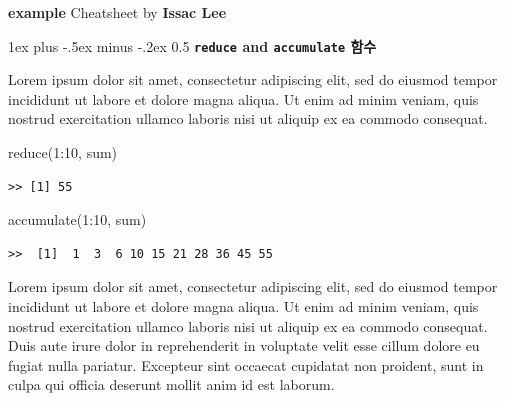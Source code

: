 \documentclass[10pt,quotespacing]{oblivoir}
\makeatletter
\newenvironment{Shaded}{\begin{snugshade}}{\end{snugshade}}
\newcommand{\DecValTok}[1]{\textcolor[rgb]{0.00,0.00,0.81}{#1}}
\newcommand{\FunctionTok}[1]{\textcolor[rgb]{0.00,0.00,0.00}{#1}}
\newcommand{\NormalTok}[1]{#1}
\newcommand{\SpecialCharTok}[1]{\textcolor[rgb]{0.00,0.00,0.00}{#1}}
\newcommand{\bcolorbox}{\begin{tcolorbox}[width=\linewidth, enhanced, breakable,colback=white,colframe=cyan!50!black]}
\newcommand{\ecolorbox}{\end{tcolorbox}}
\renewcommand{\section}{\@startsection{section}{1}{0mm}%
                        {1ex plus -.5ex minus -.2ex}%
                        {0.5\baselineskip}%
                        {\normalfont\scriptsize\bfseries}}
\makeatother
\begin{document}
\textbf{example} Cheatsheet  by \textbf{Issac Lee}

\begin{multicols*}{4}


\setlength{\premulticols}{0.25pt}
\setlength{\postmulticols}{0.25pt}
\setlength{\multicolsep}{0.25pt}
\setlength{\columnsep}{0.25pt}

\scriptsize

\bcolorbox

\hypertarget{reduce-and-accumulate-uxd568uxc218}{%
\section{\texorpdfstring{\textbf{\texttt{reduce} and \texttt{accumulate} 함수}}{reduce and accumulate 함수}}\label{reduce-and-accumulate-uxd568uxc218}}

Lorem ipsum dolor sit amet, consectetur adipiscing elit, sed do eiusmod tempor incididunt ut labore et dolore magna aliqua. Ut enim ad minim veniam, quis nostrud exercitation ullamco laboris nisi ut aliquip ex ea commodo consequat.

\begin{Shaded}
\begin{Highlighting}[]
\FunctionTok{reduce}\NormalTok{(}\DecValTok{1}\SpecialCharTok{:}\DecValTok{10}\NormalTok{, sum)}
\end{Highlighting}
\end{Shaded}

\begin{verbatim}
>> [1] 55
\end{verbatim}

\begin{Shaded}
\begin{Highlighting}[]
\FunctionTok{accumulate}\NormalTok{(}\DecValTok{1}\SpecialCharTok{:}\DecValTok{10}\NormalTok{, sum)}
\end{Highlighting}
\end{Shaded}

\begin{verbatim}
>>  [1]  1  3  6 10 15 21 28 36 45 55
\end{verbatim}

\ecolorbox

Lorem ipsum dolor sit amet, consectetur adipiscing elit, sed do eiusmod tempor incididunt ut labore et dolore magna aliqua. Ut enim ad minim veniam, quis nostrud exercitation ullamco laboris nisi ut aliquip ex ea commodo consequat. Duis aute irure dolor in reprehenderit in voluptate velit esse cillum dolore eu fugiat nulla pariatur. Excepteur sint occaecat cupidatat non proident, sunt in culpa qui officia deserunt mollit anim id est laborum.


\end{multicols*}
\end{document}
